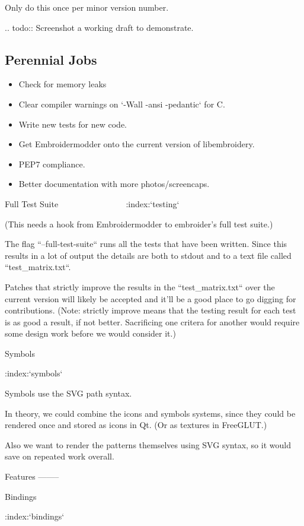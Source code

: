 \documentclass[a4paper]{report}
\begin{document}
Only do this once per minor version number.

.. todo::
   Screenshot a working draft to demonstrate.

\subsection{Perennial Jobs}

\begin{itemize}
\item Check for memory leaks
\item Clear compiler warnings on `-Wall -ansi -pedantic` for C.
\item Write new tests for new code.
\item Get Embroidermodder onto the current version of libembroidery.
\item PEP7 compliance.
\item Better documentation with more photos/screencaps.
\end{itemize}

Full Test Suite
~~~~~~~~~~~~~~~
:index:`testing`

(This needs a hook from Embroidermodder to embroider's full test suite.)

The flag ``--full-test-suite`` runs all the tests that have been written.
Since this results in a lot of output the details are both to stdout
and to a text file called ``test\_matrix.txt``.

Patches that strictly improve the results in the ``test\_matrix.txt`` over
the current version will likely be accepted and it'll be a good place
to go digging for contributions. (Note: strictly improve means that
the testing result for each test is as good a result, if not better.
Sacrificing one critera for another would require some design work
before we would consider it.)

Symbols
~~~~~~~

:index:`symbols`

Symbols use the SVG path syntax.

In theory, we could combine the icons and symbols systems, since they could be
rendered once and stored as icons in Qt. (Or as textures in FreeGLUT.)

Also we want to render the patterns themselves using SVG syntax, so it would
save on repeated work overall.

Features
--------

Bindings
~~~~~~~~

:index:`bindings`
\end{document}
